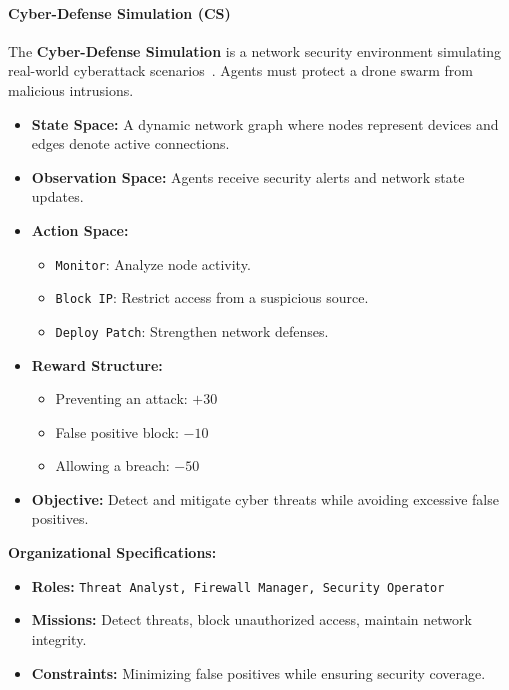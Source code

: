 \documentclass[pdflatex,sn-mathphys-num]{sn-jnl}%
\theoremstyle{thmstyleone}%
\theoremstyle{thmstyletwo}%
\theoremstyle{thmstylethree}%
\begin{document}
\paragraph{Cyber-Defense Simulation (CS)}
The \textbf{Cyber-Defense Simulation} is a network security environment simulating real-world cyberattack scenarios~\cite{Maxwell2021}. Agents must protect a drone swarm from malicious intrusions.

\begin{itemize}
    \item \textbf{State Space:} A dynamic network graph where nodes represent devices and edges denote active connections.
    \item \textbf{Observation Space:} Agents receive security alerts and network state updates.
    \item \textbf{Action Space:} 
    \begin{itemize}
        \item \texttt{Monitor}: Analyze node activity.
        \item \texttt{Block IP}: Restrict access from a suspicious source.
        \item \texttt{Deploy Patch}: Strengthen network defenses.
    \end{itemize}
    \item \textbf{Reward Structure:}
    \begin{itemize}
        \item Preventing an attack: $+30$
        \item False positive block: $-10$
        \item Allowing a breach: $-50$
    \end{itemize}
    \item \textbf{Objective:} Detect and mitigate cyber threats while avoiding excessive false positives.
\end{itemize}

\textbf{Organizational Specifications:} 
\begin{itemize}
    \item \textbf{Roles:} \texttt{Threat Analyst, Firewall Manager, Security Operator}
    \item \textbf{Missions:} Detect threats, block unauthorized access, maintain network integrity.
    \item \textbf{Constraints:} Minimizing false positives while ensuring security coverage.
\end{itemize}

\bigskip
\end{document}
